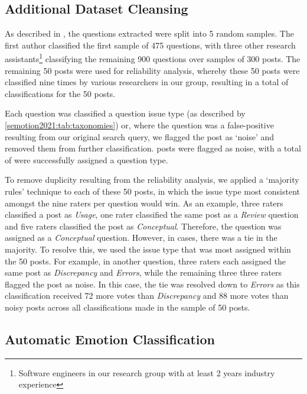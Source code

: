 \subsection{Additional Dataset Cleansing}
\label{semotion2021:ssec:method:filtering:classification}

As described in \citep{Cummaudo:2020icse}, the \SEMNumTotalPostsFromSO{} questions extracted were split into 5 random samples. The first author classified the first sample of  475 questions, with three other research assistants\footnote{Software engineers in our research group with at least 2 years industry experience} classifying the remaining 900 questions over samples of 300 posts. The remaining 50 posts were used for reliability analysis, whereby these 50 posts were classified nine times by various researchers in our group, resulting in a total of \SEMNumClassificationsFromBeyerIRRAnalysis{} classifications for the 50 posts.

Each question was classified a question issue type (as described by \cref{semotion2021:tab:taxonomies}) or, where the question was a false-positive resulting from our original search query, we flagged the post as `noise' and removed them from further classification. \SEMNumNoisyPosts{} posts were flagged as noise, with a total of \SEMNumTotalNonNoisePosts{} were successfully assigned a question type.

To remove duplicity resulting from the reliability analysis, we applied a `majority rules' technique to each of these 50 posts, in which the issue type most consistent amongst the nine raters per question would win. As an example, three raters classified a post as \textit{ Usage}, one rater classified the same post as a \textit{Review} question and {five} raters classified the post as \textit{Conceptual}. Therefore, the question was assigned as a \textit{Conceptual} question. However, in \SEMNumIRRPostsTiedMajority{} cases, there was a tie in the majority. To resolve this, we used the issue type that was most assigned within the 50 posts. For example, in another question, three raters each assigned the same post as \textit{Discrepancy} and \textit{Errors}, while the remaining three three raters flagged the post as noise. In this case, the tie was resolved down to \textit{Errors} as this classification received 72 more votes than \textit{Discrepancy} and 88 more votes than noisy posts across all classifications made in the sample of 50 posts. 

\subsection{Automatic Emotion Classification}

